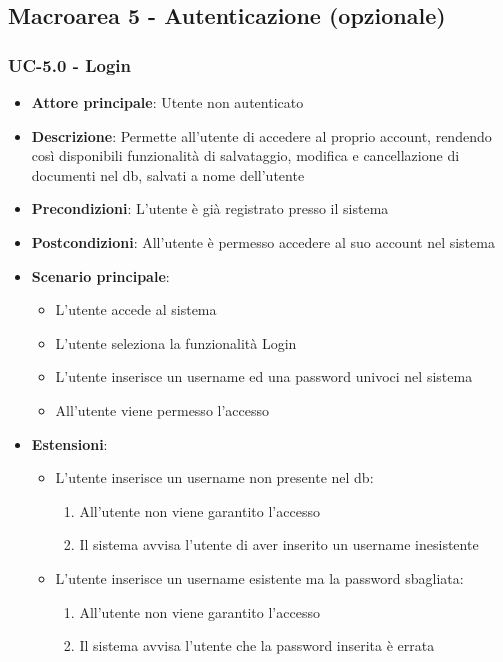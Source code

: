 \documentclass[11pt,a4paper]{article}
\begin{document}
\newpage

\subsection{Macroarea 5 - Autenticazione (opzionale)}
\subsubsection{UC-5.0 - Login}
\begin{itemize}
    \item \textbf{Attore principale}: Utente non autenticato
    \item \textbf{Descrizione}: Permette all'utente di accedere al proprio account, rendendo così disponibili funzionalità di salvataggio, modifica e cancellazione di documenti nel db, salvati a nome dell'utente
    \item \textbf{Precondizioni}: L'utente è già registrato presso il sistema
    \item \textbf{Postcondizioni}: All'utente è permesso accedere al suo account nel sistema
    \item \textbf{Scenario principale}:
        \begin{itemize}
            \item L'utente accede al sistema
            \item L'utente seleziona la funzionalità Login
            \item L'utente inserisce un username ed una password univoci nel sistema
            \item All'utente viene permesso l'accesso
        \end{itemize}
    \item \textbf{Estensioni}:
        \begin{itemize}
            \item L'utente inserisce un username non presente nel db:
                \begin{enumerate}
                    \item All'utente non viene garantito l'accesso
                    \item Il sistema avvisa l'utente di aver inserito un username inesistente
                \end{enumerate}
            \item L'utente inserisce un username esistente ma la password sbagliata:
                \begin{enumerate}
                    \item All'utente non viene garantito l'accesso
                    \item Il sistema avvisa l'utente che la password inserita è errata
                \end{enumerate}
        \end{itemize}
\end{itemize}
\end{document}
